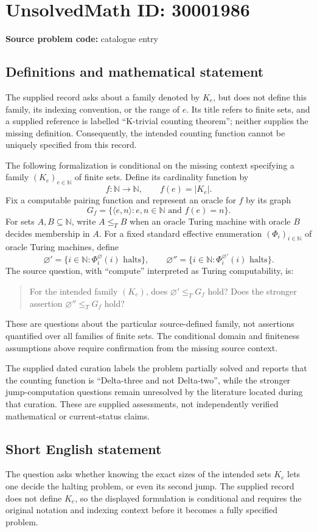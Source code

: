 \documentclass[11pt]{article}
\newcommand{\N}{\mathbb{N}}
\begin{document}
\section*{UnsolvedMath ID: 30001986}
\textbf{Source problem code:} catalogue entry
\subsection{Definitions and mathematical statement}
The supplied record asks about a family denoted by \(K_e\), but does not define this family, its indexing convention, or the range of \(e\). Its title refers to finite sets, and a supplied reference is labelled ``K-trivial counting theorem''; neither supplies the missing definition. Consequently, the intended counting function cannot be uniquely specified from this record.

The following formalization is conditional on the missing context specifying a family \((K_e)_{e\in\N}\) of finite sets. Define its cardinality function by
\[
f:\N\longrightarrow\N,\qquad f(e)=|K_e|.
\]
Fix a computable pairing function and represent an oracle for \(f\) by its graph
\[
G_f=\{\langle e,n\rangle:e,n\in\N\text{ and }f(e)=n\}.
\]
For sets \(A,B\subseteq\N\), write \(A\leq_T B\) when an oracle Turing machine with oracle \(B\) decides membership in \(A\). For a fixed standard effective enumeration \((\Phi_i)_{i\in\N}\) of oracle Turing machines, define
\[
\varnothing'=\{i\in\N:\Phi_i^{\varnothing}(i)\text{ halts}\},\qquad
\varnothing''=\{i\in\N:\Phi_i^{\varnothing'}(i)\text{ halts}\}.
\]
The source question, with ``compute'' interpreted as Turing computability, is:
\begin{quote}
For the intended family \((K_e)\), does \(\varnothing'\leq_T G_f\) hold? Does the stronger assertion \(\varnothing''\leq_T G_f\) hold?
\end{quote}
These are questions about the particular source-defined family, not assertions quantified over all families of finite sets. The conditional domain and finiteness assumptions above require confirmation from the missing source context.

The supplied dated curation labels the problem partially solved and reports that the counting function is ``Delta-three and not Delta-two'', while the stronger jump-computation questions remain unresolved by the literature located during that curation. These are supplied assessments, not independently verified mathematical or current-status claims.
\subsection{Short English statement}
The question asks whether knowing the exact sizes of the intended sets \(K_e\) lets one decide the halting problem, or even its second jump. The supplied record does not define \(K_e\), so the displayed formulation is conditional and requires the original notation and indexing context before it becomes a fully specified problem.
\end{document}
